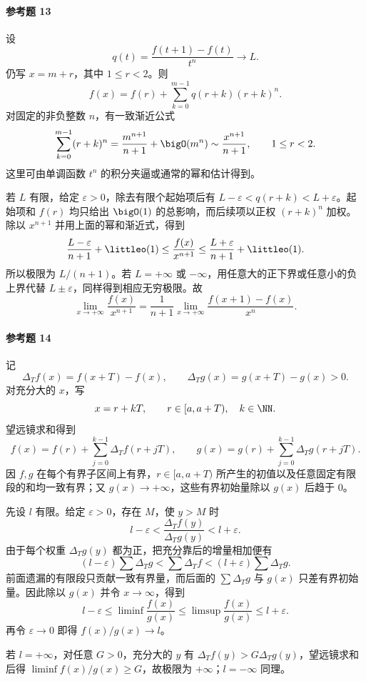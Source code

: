 \paragraph{参考题 13}
\begin{xsolution}
设
\[
  q(t)=\frac{f(t+1)-f(t)}{t^n}\to L.
\]
仍写 $x=m+r$，其中 $1\leq r<2$。则
\[
  f(x)=f(r)+\sum_{k=0}^{m-1}q(r+k)(r+k)^n.
\]
对固定的非负整数 $n$，有一致渐近公式
\[
  \sum_{k=0}^{m-1}(r+k)^n
  =\frac{m^{n+1}}{n+1}+\bigO(m^n)
  \sim\frac{x^{n+1}}{n+1},
  \qquad 1\leq r<2.
\]
这里可由单调函数 $t^n$ 的积分夹逼或通常的幂和估计得到。

若 $L$ 有限，给定 $\varepsilon>0$，除去有限个起始项后有
$L-\varepsilon<q(r+k)<L+\varepsilon$。起始项和 $f(r)$ 均只给出
$\bigO(1)$ 的总影响，而后续项以正权 $(r+k)^n$ 加权。除以 $x^{n+1}$ 并用上面的幂和渐近式，得到
\[
  \frac{L-\varepsilon}{n+1}+\littleo(1)
  \leq\frac{f(x)}{x^{n+1}}
  \leq\frac{L+\varepsilon}{n+1}+\littleo(1).
\]
所以极限为 $L/(n+1)$。若 $L=+\infty$ 或 $-\infty$，用任意大的正下界或任意小的负上界代替 $L\pm\varepsilon$，同样得到相应无穷极限。故
\[
  \lim_{x\to+\infty}\frac{f(x)}{x^{n+1}}
  =\frac1{n+1}\lim_{x\to+\infty}\frac{f(x+1)-f(x)}{x^n}.
\]
\end{xsolution}

\paragraph{参考题 14}
\begin{xsolution}
记
\[
  \Delta_T f(x)=f(x+T)-f(x),\qquad
  \Delta_T g(x)=g(x+T)-g(x)>0.
\]
对充分大的 $x$，写
\[
  x=r+kT,\qquad r\in[a,a+T),\quad k\in\NN.
\]
望远镜求和得到
\[
  f(x)=f(r)+\sum_{j=0}^{k-1}\Delta_T f(r+jT),
  \qquad
  g(x)=g(r)+\sum_{j=0}^{k-1}\Delta_T g(r+jT).
\]
因 $f,g$ 在每个有界子区间上有界，$r\in[a,a+T)$ 所产生的初值以及任意固定有限段的和均一致有界；又 $g(x)\to+\infty$，这些有界初始量除以 $g(x)$ 后趋于 0。

先设 $l$ 有限。给定 $\varepsilon>0$，存在 $M$，使 $y>M$ 时
\[
  l-\varepsilon<\frac{\Delta_T f(y)}{\Delta_T g(y)}<l+\varepsilon.
\]
由于每个权重 $\Delta_T g(y)$ 都为正，把充分靠后的增量相加便有
\[
  (l-\varepsilon)\sum\Delta_T g
  <\sum\Delta_T f
  <(l+\varepsilon)\sum\Delta_T g.
\]
前面遗漏的有限段只贡献一致有界量，而后面的 $\sum\Delta_T g$ 与 $g(x)$ 只差有界初始量。因此除以 $g(x)$ 并令 $x\to\infty$，得到
\[
  l-\varepsilon\leq\liminf\frac{f(x)}{g(x)}
  \leq\limsup\frac{f(x)}{g(x)}\leq l+\varepsilon.
\]
再令 $\varepsilon\to0$ 即得 $f(x)/g(x)\to l$。

若 $l=+\infty$，对任意 $G>0$，充分大的 $y$ 有
$\Delta_T f(y)>G\Delta_T g(y)$，望远镜求和后得
$\liminf f(x)/g(x)\geq G$，故极限为 $+\infty$；$l=-\infty$ 同理。
\end{xsolution}

